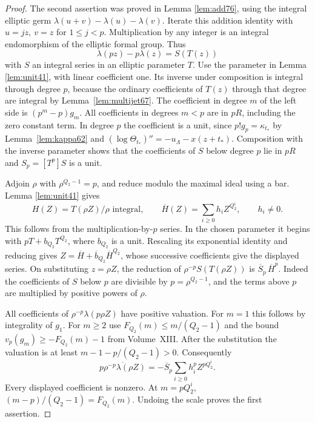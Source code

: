 \documentclass[a4paper,11pt]{article}
\theoremstyle{definition}
\theoremstyle{remark}
\numberwithin{equation}{section}
\begin{document}
\begin{proof}
The second assertion was proved in Lemma \ref{lem:add76}, using
the integral elliptic germ \(\lambda(u+v)-\lambda(u)-\lambda(v)\).
Iterate this addition identity with \(u=jz,\ v=z\) for
\(1\le j<p\). Multiplication by any integer is an integral
endomorphism of the elliptic formal group. Thus
\[
                 \lambda(pz)-p\lambda(z)=S(T(z))
\]
with \(S\) an integral series in an elliptic parameter \(T\).
Use the parameter in
Lemma \ref{lem:unit41},
with linear coefficient one. Its inverse under composition is
integral through degree \(p\), because the ordinary coefficients
of \(T(z)\) through that degree are integral by Lemma~\ref{lem:multijet67}.
The coefficient in degree \(m\) of the left side is
\((p^m-p)g_m\). All coefficients in degrees \(m<p\) are in
\(pR\), including the zero constant term. In degree \(p\) the
coefficient is a unit, since \(p!g_p=\kappa_{t_*}\) by
Lemma~\ref{lem:kappa62} and \((\log\Theta_{t_*})''=-u_\Lambda-x(z+t_*)\).
Composition with the inverse parameter shows that the coefficients
of \(S\) below degree \(p\) lie in \(pR\) and \(S_p=[T^p]S\)
is a unit.

Adjoin \(\rho\) with \(\rho^{Q_2-1}=p\), and reduce modulo the
maximal ideal using a bar. Lemma \ref{lem:unit41} gives
\[
  H(Z)=T(\rho Z)/\rho\text{ integral},\qquad
       \overline H(Z)=\sum_{i\ge0}h_i Z^{Q_2^i},
                   \qquad h_i\ne0 .
\]
This follows from the multiplication-by-\(p\) series. In the
chosen parameter it begins with \(pT+b_{Q_2}T^{Q_2}\), where
\(b_{Q_2}\) is a unit. Rescaling its exponential identity and
reducing gives \(Z=\overline H+\overline b_{Q_2}\overline H^{Q_2}\),
whose successive coefficients give the displayed series.
On substituting \(z=\rho Z\), the reduction of
\(\rho^{-p}S(T(\rho Z))\) is \(\overline S_p\,\overline H^p\).
Indeed the coefficients of \(S\) below \(p\) are divisible by
\(p=\rho^{Q_2-1}\), and the terms above \(p\) are multiplied
by positive powers of \(\rho\).

All coefficients of \(\rho^{-p}\lambda(p\rho Z)\) have positive
valuation. For \(m=1\) this follows by integrality of \(g_1\).
For \(m\ge2\) use
\(F_{Q_2}(m)\le m/(Q_2-1)\) and the bound
\(v_p(g_m)\ge -F_{Q_2}(m)-1\) from Volume~XIII. After the
substitution the valuation is at least
\(m-1-p/(Q_2-1)>0\).
Consequently
\[
       \overline{p\rho^{-p}\lambda(\rho Z)}
              =-\overline S_p\sum_{i\ge0}h_i^p Z^{pQ_2^i}.
\]
Every displayed coefficient is nonzero. At \(m=pQ_2^i\),
\((m-p)/(Q_2-1)=F_{Q_2}(m)\). Undoing the scale proves
the first assertion.
\end{proof}
\end{document}
